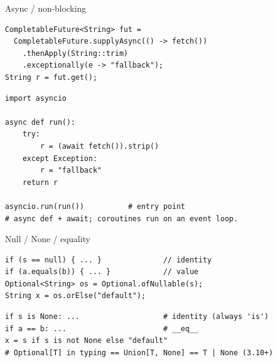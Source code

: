 \documentclass[10pt]{article}
\begin{document}
\begin{construct}{Async / non-blocking}
\noindent
\begin{minipage}[t]{0.485\linewidth}
\begin{lstlisting}[style=java, title=Java]
CompletableFuture<String> fut =
  CompletableFuture.supplyAsync(() -> fetch())
    .thenApply(String::trim)
    .exceptionally(e -> "fallback");
String r = fut.get();
\end{lstlisting}
\end{minipage}\hfill
\begin{minipage}[t]{0.485\linewidth}
\begin{lstlisting}[style=python, title=Python]
import asyncio

async def run():
    try:
        r = (await fetch()).strip()
    except Exception:
        r = "fallback"
    return r

asyncio.run(run())          # entry point
# async def + await; coroutines run on an event loop.
\end{lstlisting}
\end{minipage}
\end{construct}


\begin{construct}{Null / None / equality}
\noindent
\begin{minipage}[t]{0.485\linewidth}
\begin{lstlisting}[style=java, title=Java]
if (s == null) { ... }              // identity
if (a.equals(b)) { ... }            // value
Optional<String> os = Optional.ofNullable(s);
String x = os.orElse("default");
\end{lstlisting}
\end{minipage}\hfill
\begin{minipage}[t]{0.485\linewidth}
\begin{lstlisting}[style=python, title=Python]
if s is None: ...                   # identity (always 'is')
if a == b: ...                      # __eq__
x = s if s is not None else "default"
# Optional[T] in typing == Union[T, None] == T | None (3.10+)
\end{lstlisting}
\end{minipage}
\end{construct}
\end{document}
